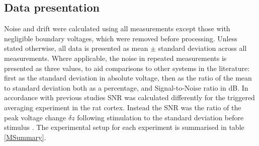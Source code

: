 \subsection{Data presentation}

Noise and drift were calculated using all measurements except those with negligible boundary voltages, which were removed before processing. Unless stated otherwise, all data is presented as mean $\pm$ standard deviation across all measurements. Where applicable, the noise in repeated measurements is presented as three values, to aid comparisons to other systems in the literature: first as the standard deviation in absolute voltage, then as the ratio of the mean to standard deviation both as a percentage, and Signal-to-Noise ratio in dB. In accordance with previous studies SNR was calculated differently for the triggered averaging experiment in the rat cortex. Instead the SNR was the ratio of the peak voltage change $\delta z$ following stimulation to the standard deviation before stimulus \cite{Oh2011}. The experimental setup for each experiment is summarised in table \ref{MSummary}.
